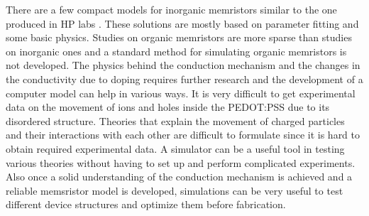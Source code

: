 \begin{doublespace}
There are a few compact models for inorganic memristors similar to the one produced in HP labs \cite{ChuaSim}\cite{MemCircuitSim}. These solutions are mostly based on parameter fitting and some basic physics. Studies on organic memristors are more sparse than studies on inorganic ones and a standard method for simulating organic memristors is not developed. The physics behind the conduction mechanism and the changes in the conductivity due to doping requires further research and the development of a computer model can help in various ways. It is very difficult to get experimental data on the movement of ions and holes inside the PEDOT:PSS due to its disordered structure. Theories that explain the movement of charged particles and their interactions with each other are difficult to formulate since it is hard to obtain required experimental data. A simulator can be a useful tool in testing various theories without having to set up and perform complicated experiments. Also once a solid understanding of the conduction mechanism is achieved and a reliable memsristor model is developed, simulations can be very useful to test different device structures and optimize them before fabrication. 


 \end{doublespace}